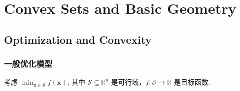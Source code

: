 \documentclass[11pt,UTF8,scheme=plain,fontset=fandol,linespread=1.3]{ctexart}
\numberwithin{figure}{section}
\begin{document}
\section{Convex Sets and Basic Geometry}

\subsection{Optimization and Convexity}

\subsubsection{一般优化模型}

考虑 $\min_{\bm{x} \in \mathcal{S}} f(\bm{x})$, 其中 $\mathcal{S} \subseteq \mathbb{R}^n$ 是可行域，$f: \mathcal{S} \to \mathbb{R}$ 是目标函数.
\end{document}
